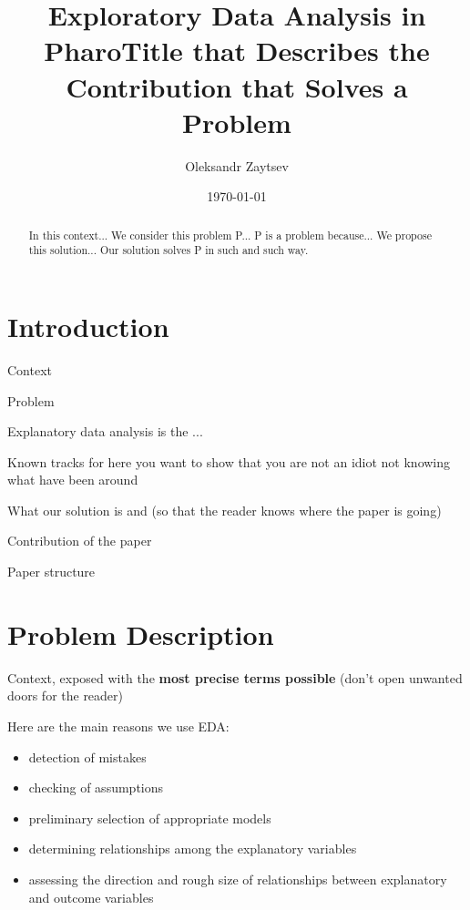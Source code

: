 \documentclass{article}
\begin{document}
\title{Exploratory Data Analysis in Pharo}
\maketitle


\title{Title that Describes the Contribution that Solves a Problem\\}
\author{Oleksandr Zaytsev}
\date{\today}
\maketitle

\begin{abstract}
In this context...
We consider this problem P...
P is a problem because...
We propose this solution...
Our solution solves P in such and such way.
\end{abstract}


\section{Introduction}
\label{sec:intro}

Context

Problem

Explanatory data analysis is the ...

Known tracks for 
	here you want to show that you are not an idiot not knowing what have been around

What our solution is  and  (so that the reader knows where the paper is going)

Contribution of the paper

Paper structure




\section{Problem Description}
\label{sec:problem}

Context, exposed with the \textbf{most precise terms possible} (don't open
unwanted doors for the reader)

Here are the main reasons we
use EDA:
\begin{itemize}
  \item detection of mistakes
  \item checking of assumptions
  \item preliminary selection of appropriate models
  \item determining relationships among the explanatory variables
  \item assessing the direction and rough size of relationships between explanatory and outcome variables
\end{itemize}
\end{document}
